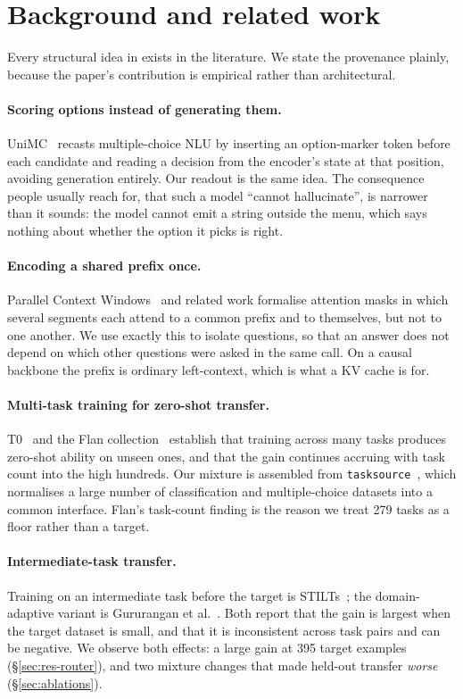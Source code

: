 \section{Background and related work}
\label{sec:background}

Every structural idea in \openjev{} exists in the literature. We state the
provenance plainly, because the paper's contribution is empirical rather
than architectural.

\paragraph{Scoring options instead of generating them.}
UniMC~\cite{unimc} recasts multiple-choice NLU by inserting an
option-marker token before each candidate and reading a decision from the
encoder's state at that position, avoiding generation entirely. Our readout
is the same idea. The consequence people usually reach for, that such a
model ``cannot hallucinate'', is narrower than it sounds: the model
cannot emit a string outside the menu, which says nothing about whether the
option it picks is right.

\paragraph{Encoding a shared prefix once.}
Parallel Context Windows~\cite{pcw} and related work formalise attention
masks in which several segments each attend to a common prefix and to
themselves, but not to one another. We use exactly this to isolate
questions, so that an answer does not depend on which other questions were
asked in the same call. On a causal backbone the prefix is ordinary
left-context, which is what a KV cache is for.

\paragraph{Multi-task training for zero-shot transfer.}
T0~\cite{t0} and the Flan collection~\cite{flan} establish that training
across many tasks produces zero-shot ability on unseen ones, and that the
gain continues accruing with task count into the high hundreds. Our mixture
is assembled from \texttt{tasksource}~\cite{tasksource}, which normalises a
large number of classification and multiple-choice datasets into a common
interface. Flan's task-count finding is the reason we treat 279 tasks as a
floor rather than a target.

\paragraph{Intermediate-task transfer.}
Training on an intermediate task before the target is
STILTs~\cite{stilts}; the domain-adaptive variant is
Gururangan et al.~\cite{dontstoppretraining}. Both report that the gain is largest when the
target dataset is small, and that it is inconsistent across task pairs and
can be negative. We observe both effects: a large gain at 395 target
examples (\S\ref{sec:res-router}), and two mixture changes that made
held-out transfer \emph{worse} (\S\ref{sec:ablations}).

